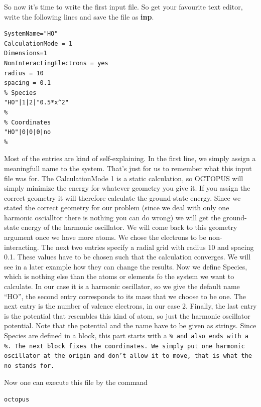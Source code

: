 \documentclass{article}
\begin{document}
So now it's time to write the first input file. So get your favourite text
editor, write the following lines and save the file as {\bf inp}.

\begin{verbatim}
SystemName="HO" 
CalculationMode = 1
Dimensions=1 
NonInteractingElectrons = yes
radius = 10
spacing = 0.1
% Species 
"HO"|1|2|"0.5*x^2" 
%
% Coordinates
"HO"|0|0|0|no
%
\end{verbatim}

Most of the entries are kind of self-explaining. In the first line, we simply
assign a meaningfull name to the system. That's just for us to remember what
this input file was for. The CalculationMode 1 is a static  calculation, so
OCTOPUS will simply minimize the energy for whatever geometry you give it. If
you assign the correct geometry it will therefore calculate the ground-state
energy. Since we stated the correct geometry for our problem (since we deal
with only one harmonic oscialltor there is nothing you can do wrong) we will
get the ground-state energy of the harmonic oscillator. We will come back to
this geometry argument once we have more atoms. We chose the electrons to be
non-interacting. The next two entries specify a radial grid with radius 10 and
spacing 0.1. These values have to be chosen such that the calculation
converges. We will see in a later example how they can change the results. Now
we define Species, which is nothing else than the atoms or elements fo the
system we want to calculate. In our case it is a harmonic oscillator, so we
give the default name ``HO'', the second entry corresponds to its mass that we
choose to be one. The next entry is the number of valence electrons, in our
case 2. Finally, the last entry is the potential that resembles this kind of atom, so
just the harmonic oscillator potential. Note that the potential and the name
have to be given as strings. Since Species are defined in a block, this part
starts with a \tt \% \rm and also ends with a \tt\%\rm. The next block  fixes
the coordinates. We simply put one harmonic oscillator at the origin and don't
allow it to move, that is what the \tt no \rm stands for.

Now one can execute this file by the command

\tt octopus
\rm
\end{document}

